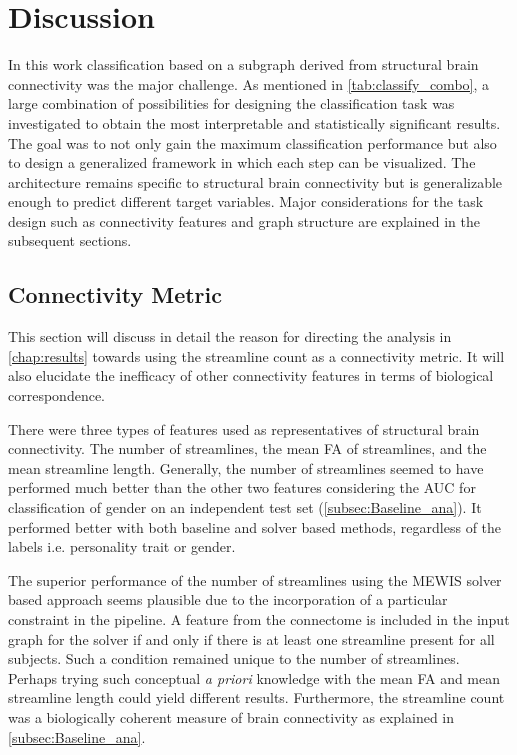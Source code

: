 \documentclass[msthesis.tex]{subfiles}
\begin{document}
\chapter{Discussion}
In this work classification based on a subgraph derived from structural brain connectivity was the major challenge. As mentioned in \autoref{tab:classify_combo}, a large combination of possibilities for designing the classification task was investigated to obtain the most interpretable and statistically significant results. The goal was to not only gain the maximum classification performance but also to design a generalized framework in which each step can be visualized. The architecture remains specific to structural brain connectivity but is generalizable enough to predict different target variables. Major considerations for the task design such as connectivity features and graph structure are explained in the subsequent sections.

\section{Connectivity Metric}
\label{disc:connfe}
This section will discuss in detail the reason for directing the analysis in \autoref{chap:results} towards using the streamline count as a connectivity metric. It will also elucidate the inefficacy of other connectivity features in terms of biological correspondence.   

There were three types of features used as representatives of structural brain connectivity. The number of streamlines, the mean \gls{FA} of streamlines, and the mean streamline length. Generally, the number of streamlines seemed to have performed much better than the other two features considering the \gls{AUC} for classification of gender on an independent test set (\autoref{subsec:Baseline_ana}). It performed better with both baseline and solver based methods, regardless of the labels i.e. personality trait or gender. 

The superior performance of the number of streamlines using the \gls{MEWIS} solver based approach seems plausible due to the incorporation of a particular constraint in the pipeline. A feature from the connectome is included in the input graph for the solver if and only if there is at least one streamline present for all subjects. Such a condition remained unique to the number of streamlines. Perhaps trying such conceptual \textit{a priori} knowledge with the mean \gls{FA} and mean streamline length could yield different results. Furthermore, the streamline count was a biologically coherent measure of brain connectivity as explained in \ref{subsec:Baseline_ana}.
\end{document}
